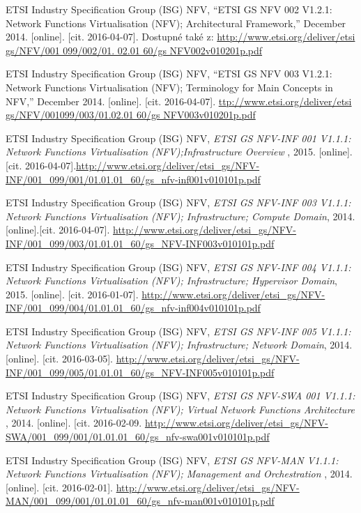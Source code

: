 \begin{thebibliography}{10}
ETSI Industry Specification Group (ISG) NFV, “ETSI GS NFV 002 V1.2.1: Network Functions Virtualisation (NFV); Architectural Framework,” December 2014. [online]. [cit. 2016-04-07]. Dostupné také z: \url{http://www.etsi.org/deliver/etsi gs/NFV/001 099/002/01. 02.01 60/gs NFV002v010201p.pdf} 

ETSI Industry Specification Group (ISG) NFV, “ETSI GS NFV 003 V1.2.1: Network Functions Virtualisation (NFV); Terminology for Main Concepts in NFV,” December 2014. [online]. [cit. 2016-04-07]. \url{ttp://www.etsi.org/deliver/etsi gs/NFV/001099/003/01.02.01 60/gs NFV003v010201p.pdf}

ETSI Industry Specification Group (ISG) NFV, \emph{ETSI GS NFV-INF 001 V1.1.1: Network Functions Virtualisation (NFV);Infrastructure Overview }, 2015. [online]. [cit. 2016-04-07].\url{http://www.etsi.org/deliver/etsi_gs/NFV-INF/001_099/001/01.01.01_60/gs_nfv-inf001v010101p.pdf}

ETSI Industry Specification Group (ISG) NFV, \emph{ETSI GS NFV-INF 003 V1.1.1: Network Functions Virtualisation (NFV);
Infrastructure; Compute Domain}, 2014. [online].[cit. 2016-04-07]. \url{http://www.etsi.org/deliver/etsi_gs/NFV-INF/001_099/003/01.01.01_60/gs_NFV-INF003v010101p.pdf}

 ETSI Industry Specification Group (ISG) NFV, \emph{ETSI GS NFV-INF 004 V1.1.1: Network Functions Virtualisation (NFV); Infrastructure; Hypervisor Domain}, 2015. [online]. [cit. 2016-01-07]. \url{http://www.etsi.org/deliver/etsi_gs/NFV-INF/001_099/004/01.01.01_60/gs_nfv-inf004v010101p.pdf}

 ETSI Industry Specification Group (ISG) NFV, \emph{ETSI GS NFV-INF 005 V1.1.1: Network Functions Virtualisation (NFV); Infrastructure; Network Domain}, 2014. [online]. [cit. 2016-03-05]. \url{http://www.etsi.org/deliver/etsi_gs/NFV-INF/001_099/005/01.01.01_60/gs_NFV-INF005v010101p.pdf}

 ETSI Industry Specification Group (ISG) NFV, \emph{ETSI GS NFV-SWA 001 V1.1.1: Network Functions Virtualisation (NFV); Virtual Network Functions Architecture  }, 2014. [online]. [cit. 2016-02-09. \url{http://www.etsi.org/deliver/etsi_gs/NFV-SWA/001_099/001/01.01.01_60/gs_nfv-swa001v010101p.pdf}

 ETSI Industry Specification Group (ISG) NFV, \emph{ETSI GS NFV-MAN V1.1.1: Network Functions Virtualisation (NFV);
Management and Orchestration }, 2014. [online]. [cit. 2016-02-01]. \url{http://www.etsi.org/deliver/etsi_gs/NFV-MAN/001_099/001/01.01.01_60/gs_nfv-man001v010101p.pdf}


\end{thebibliography}
